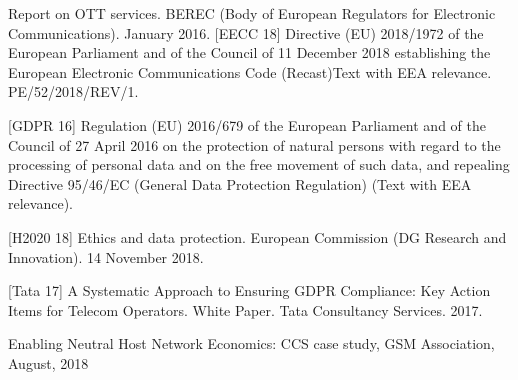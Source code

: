 \documentclass[12pt]{amsart}
\begin{document}
\begin{multicols}{2}
\begin{thebibliography}{9}
 Report on OTT services. BEREC (Body of European Regulators for Electronic Communications). January 2016.
 [EECC 18] Directive (EU) 2018/1972 of the European
  Parliament and of the Council of 11 December 2018 establishing the
  European Electronic Communications Code (Recast)Text with EEA
  relevance. PE/52/2018/REV/1.

 [GDPR 16] Regulation (EU) 2016/679 of the European
  Parliament and of the Council of 27 April 2016 on the protection of
  natural persons with regard to the processing of personal data and
  on the free movement of such data, and repealing Directive 95/46/EC
  (General Data Protection Regulation) (Text with EEA relevance).

 [H2020 18] Ethics and data protection. European
  Commission (DG Research and Innovation). 14 November 2018.

 [Tata 17] A Systematic Approach to Ensuring GDPR
    Compliance: Key Action Items for Telecom Operators. White
    Paper. Tata Consultancy Services. 2017.

 Enabling Neutral Host
Network Economics: CCS case study, GSM Association, August, 2018
\end{thebibliography}
\clearpage


\end{multicols}
\end{document}
